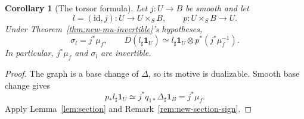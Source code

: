 \documentclass[11pt,reqno]{amsart}
\newtheorem{corollary}[theorem]{Corollary}
\theoremstyle{definition}
\theoremstyle{remark}
\theoremstyle{plain}
\numberwithin{equation}{section}
\newcommand{\one}{\mathbf 1}
\begin{document}
\begin{corollary}[The torsor formula]\label{cor:new-torsor-duality}
Let \(j:U\to B\) be smooth and let
\[
 l=(\mathrm{id},j):U\to U\times_S B,\qquad p:U\times_S B\to U.
\]
Under Theorem~\ref{thm:new-mu-invertible}'s hypotheses,
\[
 \sigma_l=j^*\mu_f,\qquad
 D(l_\sharp\one_U)\simeq
 l_\sharp\one_U\otimes p^*(j^*\mu_f^{-1}).
\]
In particular, \(j^*\mu_f\) and \(\sigma_l\) are invertible.
\end{corollary}
\begin{proof}
The graph is a base change of \(\Delta\), so its motive is dualizable.
Smooth base change gives
\[
 p_*l_\sharp\one_U
 \simeq j^*q_{1*}\Delta_\sharp\one_B=j^*\mu_f.
\]
Apply Lemma~\ref{lem:section} and Remark~\ref{rem:new-section-sign}.
\end{proof}
\end{document}
